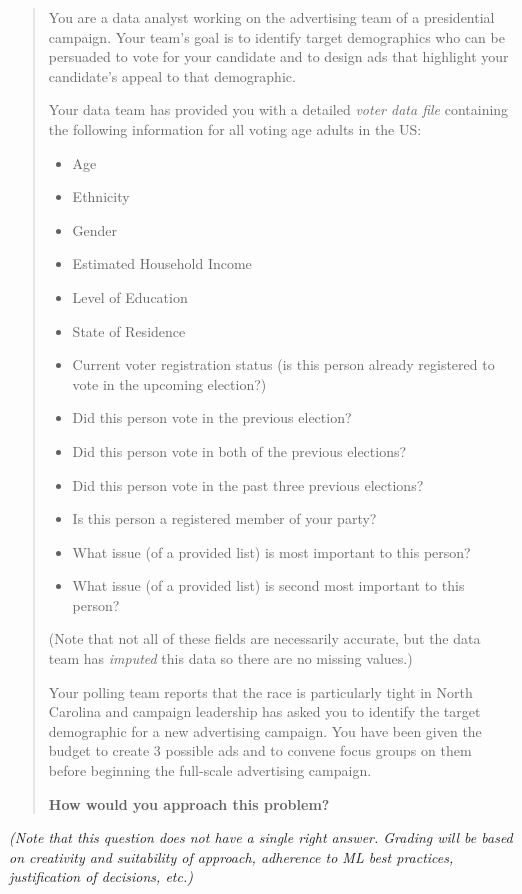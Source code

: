 \documentclass[12pt]{article}
\begin{document}
\begin{quote}
    You are a data analyst working on the advertising team of a presidential campaign. Your team's goal is to identify target demographics who can be persuaded to vote for your candidate and to design ads that highlight your candidate's appeal to that demographic. 

    Your data team has provided you with a detailed \emph{voter data file} containing the following information for all voting age adults in the US: 
    \begin{itemize}
        \item Age
        \item Ethnicity
        \item Gender
        \item Estimated Household Income
        \item Level of Education
        \item State of Residence
        \item Current voter registration status (is this person already registered to vote in the upcoming election?)
        \item Did this person vote in the previous election?
        \item Did this person vote in both of the previous elections?
        \item Did this person vote in the past three previous elections?
        \item Is this person a registered member of your party?
        \item What issue (of a provided list) is most important to this person?
        \item What issue (of a provided list) is second most important to this person?
    \end{itemize}
    (Note that not all of these fields are necessarily accurate, but the data team has \emph{imputed} this data so there are no missing values.)

    Your polling team reports that the race is particularly tight in North Carolina and campaign leadership has asked you to identify the target demographic for a new advertising campaign. You have been given the budget to create 3 possible ads and to convene focus groups on them before beginning the full-scale advertising campaign. 

    {\bf How would you approach this problem?}
\end{quote}
\emph{(Note that this question does not have a single right answer. Grading will be based on creativity and suitability of approach, adherence to ML best practices, justification of decisions, etc.)}
\clearpage
\end{document}
